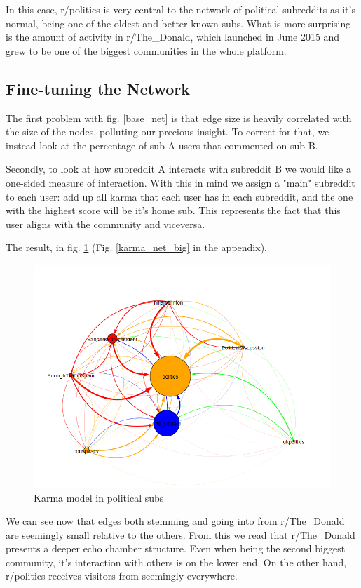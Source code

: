 \documentclass[11pt]{article}
\begin{document}
In this case, r/politics is very central to the network of political subreddits as it's normal, being one of the oldest and better known subs. What is more surprising is the amount of activity in r/The\_Donald, which launched in June 2015 and grew to be one of the biggest communities in the whole platform.
 
\subsection{Fine-tuning the Network}
The first problem with fig. \ref{base_net} is that edge size is heavily correlated with the size of the nodes, polluting our precious insight. To correct for that, we instead look at the percentage of sub A users that commented on sub B. 

Secondly, to look at how subreddit A interacts with subreddit B we would like a one-sided measure of interaction. With this in mind we assign a "main" subreddit to each user: add up all karma that each user has in each subreddit, and the one with the highest score will be it's home sub. This represents the fact that this user aligns with the community and viceversa.

The result, in fig. \ref{karma_net} (Fig. \ref{karma_net_big} in the appendix).

\begin{figure}[h]
	\includegraphics[width=\columnwidth]{img/karma_model.png}
	\caption{\label{karma_net} Karma model in political subs}
\end{figure}

We can see now that edges both stemming and going into from r/The\_Donald are seemingly small relative to the others. From this we read that r/The\_Donald presents a deeper echo chamber structure. Even when being the second biggest community, it's interaction with others is on the lower end. On the other hand, r/politics receives visitors from seemingly everywhere.
\end{document}
